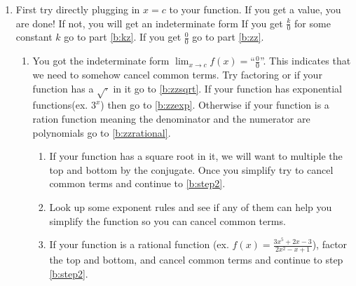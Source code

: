 \documentclass[12pt]{article}
\begin{document}
\begin{enumerate}
    \item \label{b:step1} First try directly plugging in $x=c$ to your function. 
    If you get a value, you are done! If not, you will get an indeterminate form
    If you get $\frac{k}{0}$ for some constant $k$ go to part \ref{b:kz}. If you get  $\frac{0}{0}$ go to part \ref{b:zz}.
    \begin{enumerate}[label=(\alph*)]
        \item \label{b:zz} You got the indeterminate form $\displaystyle{\lim_{x\to c}f(x)}=$``$\frac{0}{0}$''. 
        This indicates that we need to somehow cancel common terms. Try factoring or if your function has 
        a $\sqrt{\cdot}$ in it go to \ref{b:zzsqrt}. If your function has exponential functions(ex. $3^x$) 
        then go to \ref{b:zzexp}. Otherwise if your function is a ration function meaning the denominator and 
        the numerator are polynomials go to \ref{b:zzrational}.
        \begin{enumerate}[label=(\roman*)]
            \item \label{b:zzsqrt}
                If your function has a square root in it, we will want to multiple the top and bottom by the conjugate. 
                Once you simplify try to cancel common terms and continue to \ref{b:step2}.\\
            \item \label{b:zzexp}
                Look up some exponent rules and see if any of them can help you simplify the function so you can cancel common terms.
            \item \label{b:zzrational}
                If your function is a rational function (ex. $f(x)=\frac{3x^5+2x-3}{2x^2-x+1}$), 
                factor the top and bottom, and cancel common terms and continue to step \ref{b:step2}.\\
        \end{enumerate}


\end{enumerate}
\end{enumerate}
\end{document}
